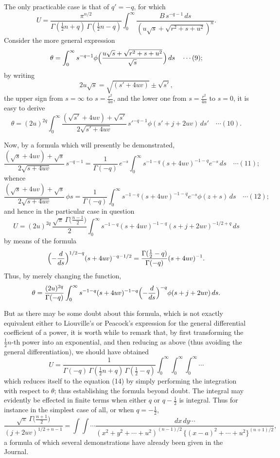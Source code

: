 \documentclass[12pt,a4paper]{article}
\begin{document}
The only practicable case is that of $q' = -q$, for which
\[
U = \frac{\pi^{n/2}}{\Gamma(\tfrac12 n + q)\,\Gamma(\tfrac12 n - q)}\int_0^\infty\frac{B\,s^{-q-1}\,ds}{(u\sqrt{s} + \sqrt{r^2 + s + u^2})^n}.
\]
Consider the more general expression
\[
\theta = \int_0^\infty s^{-q-1}\phi\Bigl(\frac{u\sqrt{s} + \sqrt{r^2 + s + u^2}}{\sqrt{s}}\Bigr)\,ds \quad\cdots(9);
\]
by writing
\[
2u\sqrt{s} = \sqrt{(s' + 4uv)} \pm \sqrt{s'},
\]
the upper sign from $s = \infty$ to $s = \tfrac{r^2}{4u}$, and the lower one from $s = \tfrac{r^2}{4u}$ to $s = 0$, it is easy to derive
\[
\theta = (2u)^{2q}\int_0^\infty \frac{(\sqrt{s'} + 4uv) + \sqrt{s'}}{2\sqrt{s' + 4uv}}\,s'^{-q-1}\phi(s' + j + 2uv)\,ds' \quad\cdots(10).
\]

Now, by a formula which will presently be demonstrated,
\[
\frac{(\sqrt{s} + 4uv) + \sqrt{s}}{2\sqrt{s + 4uv}}\,s^{-q-1} = \frac{1}{\Gamma(-q)}\,e^{-s} \int_0^\infty s^{-1-q}(s + 4uv)^{-1-q}e^{-s}\,ds \quad\cdots(11);
\]
whence
\[
\frac{(\sqrt{s} + 4uv) + \sqrt{s}}{2\sqrt{s + 4uv}}\,\phi s = \frac{1}{\Gamma(-q)} \int_0^\infty s^{-1-q}(s + 4uv)^{-1-q}e^{-s}\phi(z + s)\,ds \quad\cdots(12);
\]
and hence in the particular case in question
\[
U = (2u)^{2q}\,\frac{\sqrt{\pi}\,\Gamma\bigl(\tfrac{n-1}{2}\bigr)}{2} \int_0^\infty s^{-1-q}(s + 4uv)^{-1-q}(s + j + 2uv)^{-1/2 + q}\,ds
\]
by means of the formula
\[
\Bigl(-\frac{d}{ds}\Bigr)^{1/2 - q}(s + 4uv)^{-q-1/2} = \frac{\Gamma(\tfrac12 - q)}{\Gamma(-q)}(s + 4uv)^{-1}.
\]
Thus, by merely changing the function,
\[
\theta = \frac{(2u)^{2q}}{\Gamma(-q)}\int_0^\infty s^{-1-q}(s + 4uv)^{-1-q}\Bigl(-\frac{d}{ds}\Bigr)^{-q}\phi(s + j + 2uv)\,ds.
\]

But as there may be some doubt about this formula, which is not exactly equivalent either to Liouville's or Peacock's expression for the general differential coefficient of a power, it is worth while to remark that, by first transforming the $\tfrac12 n$-th power into an exponential, and then reducing as above (thus avoiding the general differentiation), we should have obtained
\[
U = \frac{1}{\Gamma(-q)\,\Gamma(\tfrac12 n + q)\,\Gamma(\tfrac12 - q)}\int_0^\infty\!\int_0^\infty\!\int_0^\infty\cdots
\]
which reduces itself to the equation (14) by simply performing the integration with respect to $\theta$; thus establishing the formula beyond doubt\footnotemark. The integral may evidently be effected in finite terms when either $q$ or $q - \tfrac12$ is integral. Thus for instance in the simplest case of all, or when $q = -\tfrac12$,
\[
\frac{\sqrt{\pi}\,\Gamma\bigl(\tfrac{n+1}{2}\bigr)}{(j + 2uv)^{1/2 + n - 1}} = \int\!\!\int\cdots \frac{dx\,dy\cdots}{(x^2 + y^2 + \cdots + u^2)^{(n-1)/2}\,\{(x-a)^2 + \cdots + u^2\}^{(n+1)/2}},
\]
a formula of which several demonstrations have already been given in the Journal.
\end{document}
